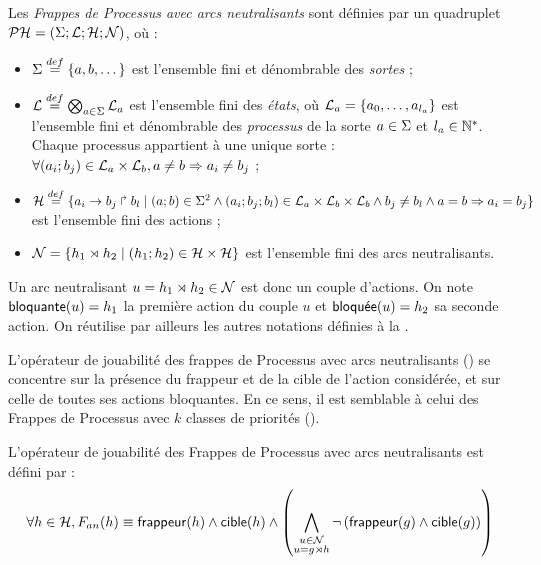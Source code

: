 \begin{definition}
  Les \emph{Frappes de Processus avec arcs neutralisants} sont définies par
  un quadruplet $\mathcal{PH} = (\Sigma ; \mathcal{L} ; \mathcal{H} ; \mathcal{N})$, où :
  \begin{itemize}
    \item $\Sigma \stackrel{def}= \{a, b, \dots\}$ est l'ensemble fini et dénombrable des \emph{sortes} ;
    \item $\mathcal{L} \stackrel{def}= \bigotimes_{a \in \Sigma} \mathcal{L}_a$ est l'ensemble fini des \emph{états},
      où $\mathcal{L}_a = \{a_0, \ldots, a_{l_a}\}$ est l'ensemble fini et dénombrable
      des \emph{processus} de la sorte $a \in \Sigma$ et $l_a \in \mathbb{N}^*$.
      Chaque processus appartient à une unique sorte :
      $\forall (a_i; b_j) \in \mathcal{L}_a \times \mathcal{L}_b, a \neq b \Rightarrow a_i \neq b_j$ ;
    \item $\mathcal{H} \stackrel{def}= \{a_i\rightarrow b_j\Rsh b_l \mid (a; b) \in \Sigma^2 \wedge
      (a_i; b_j; b_l) \in \mathcal{L}_a \times \mathcal{L}_b \times \mathcal{L}_b \wedge
      b_j \neq b_l \wedge a = b \Rightarrow a_i = b_j \}$ est l'ensemble fini des actions ;
    \item $\mathcal{N} = \{h_1\rtimes h_2 \mid (h_1 ; h_2) \in \mathcal{H} \times \mathcal{H}\}$
      est l'ensemble fini des arcs neutralisants.
  \end{itemize}
\end{definition}

Un arc neutralisant $u = h_1\rtimes h_2 \in \mathcal{N}$ est donc un couple d'actions.
On note $\mathsf{bloquante}(u) = h_1$ la première action du couple $u$
et $\mathsf{bloqu\acute{e}e}(u) = h_2$ sa seconde action.
On réutilise par ailleurs les autres notations définies à la .

L'opérateur de jouabilité des frappes de Processus avec arcs neutralisants ()
se concentre sur la présence du frappeur et de la cible de l'action considérée,
et sur celle de toutes ses actions bloquantes.
En ce sens, il est semblable à celui des Frappes de Processus avec $k$ classes de priorités
().

\begin{definition}
  L'opérateur de jouabilité des Frappes de Processus avec arcs neutralisants est défini par :
  \[\forall h \in \mathcal{H}, F_{an}(h) \equiv \mathsf{frappeur}(h) \wedge \mathsf{cible}(h) \wedge
    \left( \bigwedge_{\substack{u \in \mathcal{N}\\u = g\rtimes h}}
    \neg \left( \mathsf{frappeur}(g) \wedge \mathsf{cible}(g) \right) \right)\]
\end{definition}




